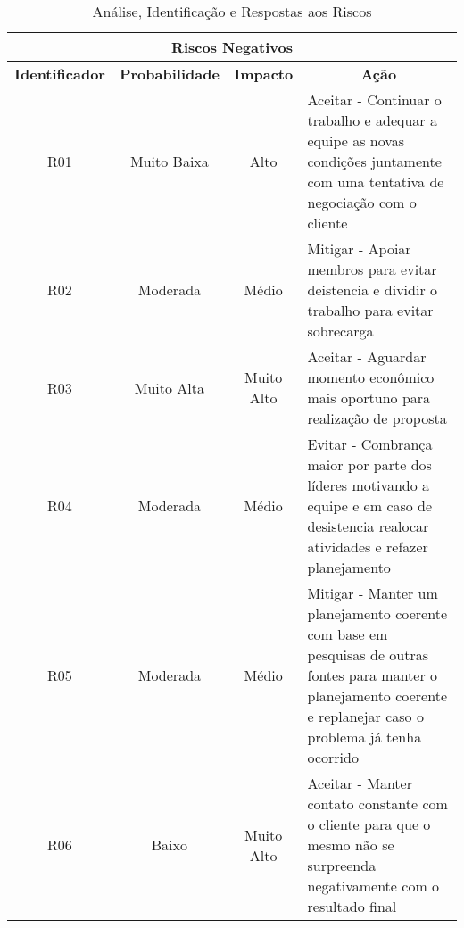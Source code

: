 \begin{table}[!h]
  \centering
  \caption{Análise, Identificação e Respostas aos Riscos}
  \begin{tabular}{|c|c|c|l|}
    \hline
    \multicolumn{4}{|c|}{\textbf{Riscos Negativos}}                                                                                                                                                                                               \\ \hline
    \textbf{Identificador} & \textbf{Probabilidade} & \textbf{Impacto} & \multicolumn{1}{c|}{\textbf{Ação}}                                                                                                                                       \\ \hline
    R01                    & Muito Baixa            & Alto             & \parbox[t]{5cm}{Aceitar - Continuar o trabalho e adequar a equipe as novas condições juntamente com uma tentativa de negociação com o cliente}                                            \\ \hline
    R02                    & Moderada               & Médio            & \parbox[t]{5cm}{Mitigar - Apoiar membros para evitar deistencia e dividir o trabalho para evitar sobrecarga}                                                                              \\ \hline
    R03                    & Muito Alta             & Muito Alto       & \parbox[t]{5cm}{Aceitar - Aguardar momento econômico mais oportuno para realização de proposta}                                                                                           \\ \hline
    R04                    & Moderada               & Médio            & \parbox[t]{5cm}{Evitar - Combrança maior por parte dos líderes motivando a equipe e em caso de desistencia realocar atividades e refazer planejamento}                                    \\ \hline
    R05                    & Moderada               & Médio            & \parbox[t]{5cm}{Mitigar - Manter um planejamento coerente com base em pesquisas de outras fontes para manter o planejamento coerente e replanejar caso o problema já tenha ocorrido}      \\ \hline
    R06                    & Baixo                  & Muito Alto       & \parbox[t]{5cm}{Aceitar - Manter contato constante com o cliente para que o mesmo não se surpreenda negativamente com o resultado final}                                                  \\ \hline
  \end{tabular}
\end{table}

